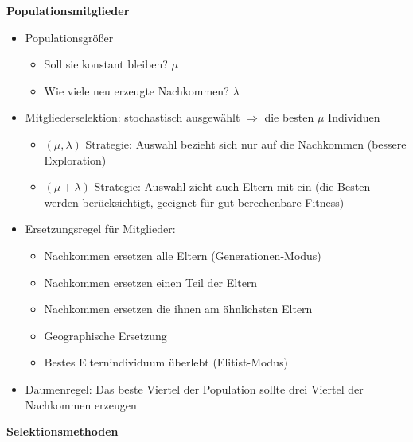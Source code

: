 %
\textbf{Populationsmitglieder}
\begin{itemize}
	\item Populationsgrößer
	\begin{itemize}
		\item Soll sie konstant bleiben? $\mu$
		\item Wie viele neu erzeugte Nachkommen? $\lambda$
	\end{itemize}
	\item Mitgliederselektion: stochastisch ausgewählt $\Rightarrow$ die besten $\mu$ Individuen
	\begin{itemize}
		\item $(\mu, \lambda)$ Strategie: Auswahl bezieht sich nur auf die Nachkommen (bessere Exploration)
		\item $(\mu + \lambda)$ Strategie: Auswahl zieht auch Eltern mit ein (die Besten werden berücksichtigt, geeignet für gut berechenbare Fitness)
	\end{itemize}
	\item Ersetzungsregel für Mitglieder:
	\begin{itemize}
		\item Nachkommen ersetzen alle Eltern (Generationen-Modus)
		\item Nachkommen ersetzen einen Teil der Eltern
		\item Nachkommen ersetzen die ihnen am ähnlichsten Eltern
		\item Geographische Ersetzung
		\item Bestes Elternindividuum überlebt (Elitist-Modus)
	\end{itemize}
	\item Daumenregel: Das beste Viertel der Population sollte drei Viertel der Nachkommen erzeugen
\end{itemize}
%
\textbf{Selektionsmethoden}
